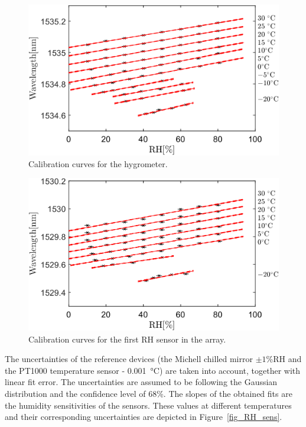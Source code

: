 \begin{figure}[!h]
\centering
\includegraphics[width=0.67\columnwidth]{Chapter5/images/RHS.png}
\caption{Calibration curves for the hygrometer.}
\label{fig_single_calibration}
\end{figure}

\begin{figure}[!h]
\centering
\includegraphics[width=0.67\columnwidth]{Chapter5/images/RH1.png}
\caption{Calibration curves for the first \gls{RH} sensor in the array.}
\label{fig_array_calibration}
\end{figure}
\newpage
The uncertainties of the reference devices (the Michell chilled mirror $\pm 1$\%RH and the PT1000 temperature sensor - \SI{0.001}{\celsius}) are taken into account, together with linear fit error. The uncertainties are assumed to be following the Gaussian distribution and the confidence level of $68$\%. The slopes of the obtained fits are the humidity sensitivities of the sensors. These values at different temperatures and their corresponding uncertainties are depicted in Figure~\ref{fig_RH_sens}. 

